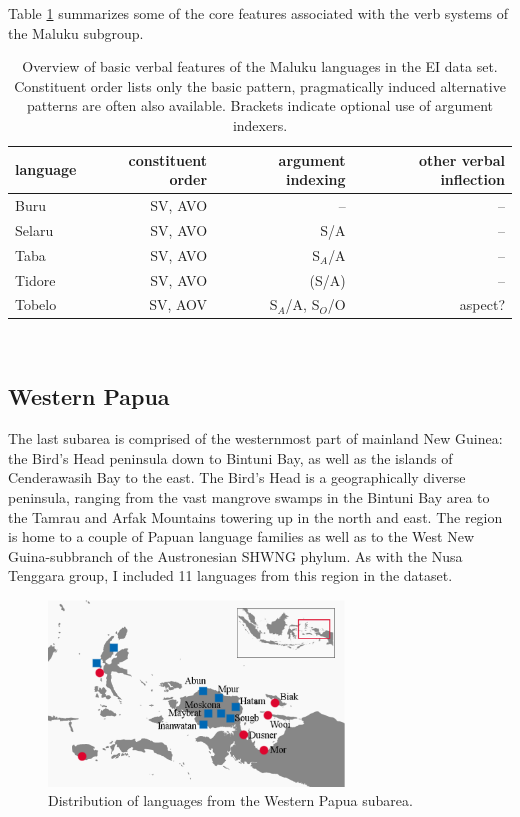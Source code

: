 Table \ref{table:overviewmaluku} summarizes some of the core features associated with the verb systems of the Maluku subgroup.

\begin{table}[h]

\begin{footnotesize}
\begin{tabular}{l r r r}
\hline\hline
language & constituent order & argument indexing & other verbal inflection \tabularnewline
\hline
Buru & SV, AVO & -- & -- \tabularnewline
Selaru & SV, AVO & S/A & -- \tabularnewline
Taba & SV, AVO & S$_A$/A & -- \tabularnewline
Tidore & SV, AVO & (S/A) & -- \tabularnewline
Tobelo & SV, AOV & S$_A$/A, S$_O$/O & aspect? \tabularnewline
\hline
\end{tabular}
\caption[Basic features of Maluku verb systems]{Overview of basic verbal features of the Maluku languages in the EI data set. Constituent order lists only the basic pattern, pragmatically induced alternative patterns are often also available. Brackets indicate optional use of argument indexers.}
\label{table:overviewmaluku}
\end{footnotesize}

\end{table}
\

\subsection{Western Papua}\label{sec:westpapua2}

The last subarea is comprised of the westernmost part of mainland New Guinea: the Bird's Head peninsula down to Bintuni Bay, as well as the islands of Cenderawasih Bay to the east. The Bird's Head is a geographically diverse peninsula, ranging from the vast mangrove swamps in the Bintuni Bay area to the Tamrau and Arfak Mountains towering up in the north and east. The region is home to a couple of Papuan language families as well as to the West New Guina-subbranch of the Austronesian SHWNG phylum. As with the Nusa Tenggara group, I included 11 languages from this region in the dataset. 

\begin{figure}

\includegraphics[width=0.7\textwidth]{figures/Map_Papua2.eps}
\caption{Distribution of languages from the Western Papua subarea.}\label{map:Pap}

\end{figure}

